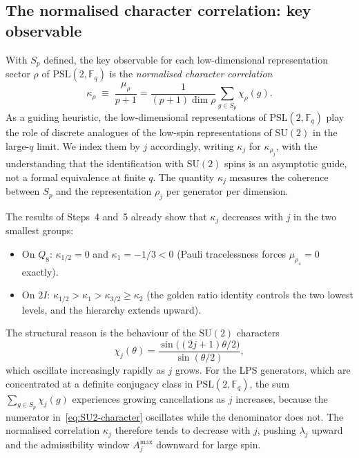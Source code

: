   \subsection{The normalised character correlation: key observable}
    \label{sec:step6a-coherence}

    With $S_p$ defined, the key observable for each low-dimensional
    representation sector $\rho$ of $\mathrm{PSL}(2,\mathbb{F}_q)$ is the
    \emph{normalised character correlation}
    \begin{equation}
      \kappa_\rho \;\equiv\; \frac{\mu_\rho}{p+1}
      = \frac{1}{(p+1)\dim\rho} \sum_{g \in S_p} \chi_\rho(g).
      \label{eq:coherence}
    \end{equation}
    As a guiding heuristic, the low-dimensional representations of
    $\mathrm{PSL}(2,\mathbb{F}_q)$ play the role of discrete analogues of
    the low-spin representations of $\mathrm{SU}(2)$ in the large-$q$ limit.
    We index them by $j$ accordingly, writing $\kappa_j$ for $\kappa_{\rho_j}$,
    with the understanding that the identification with $\mathrm{SU}(2)$ spins
    is an asymptotic guide, not a formal equivalence at finite $q$.
    The quantity $\kappa_j$ measures the coherence between $S_p$ and the
    representation $\rho_j$ per generator per dimension.

    The results of Steps~4 and~5 already show that $\kappa_j$ decreases
    with $j$ in the two smallest groups:
    \begin{itemize}
      \item On $Q_8$: $\kappa_{1/2} = 0$ and $\kappa_1 = -1/3 < 0$
      (Pauli tracelessness forces $\mu_{\rho_4} = 0$ exactly).
      \item On $2I$: $\kappa_{1/2} > \kappa_1 > \kappa_{3/2} \geq \kappa_2$
      (the golden ratio identity controls the two lowest levels, and the
      hierarchy extends upward).
    \end{itemize}
    The structural reason is the behaviour of the $\mathrm{SU}(2)$ characters
    \begin{equation}
      \chi_j(\theta) = \frac{\sin\bigl((2j+1)\theta/2\bigr)}{\sin(\theta/2)},
      \label{eq:SU2-character}
    \end{equation}
    which oscillate increasingly rapidly as $j$ grows.
    For the LPS generators, which are concentrated at a definite conjugacy
    class in $\mathrm{PSL}(2,\mathbb{F}_q)$, the sum $\sum_{g \in S_p}
\chi_j(g)$ experiences growing cancellations as $j$ increases, because
    the numerator in~\eqref{eq:SU2-character} oscillates while the
    denominator does not.
    The normalised correlation $\kappa_j$ therefore tends to decrease with
    $j$, pushing $\lambda_j$ upward and the admissibility window
    $A^{\max}_j$ downward for large spin.

